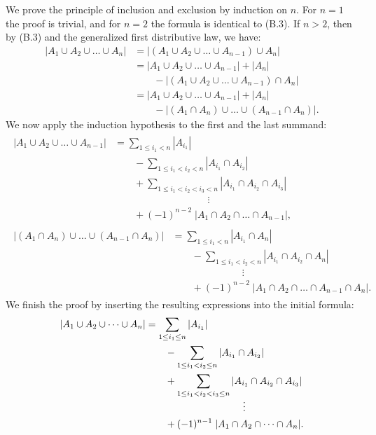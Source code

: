 We prove the principle of inclusion and exclusion by induction on $n$.
For $n=1$ the proof is trivial, and for $n=2$ the formula is identical to (B.3).
If $n>2$, then by (B.3) and the generalized first distributive law, we have:
\begin{align*}
    |A_1\cup A_2\cup\dots\cup A_n| &= |(A_1\cup A_2\cup\dots\cup A_{n-1})\cup A_n| \\
    &= |A_1\cup A_2\cup\dots\cup A_{n-1}|+|A_n| \\
    &\qquad {}-|(A_1\cup A_2\cup\dots\cup A_{n-1})\cap A_n| \\
    &= |A_1\cup A_2\cup\dots\cup A_{n-1}|+|A_n| \\
    &\qquad {}-|(A_1\cap A_n)\cup\dots\cup(A_{n-1}\cap A_n)|.
\end{align*}
We now apply the induction hypothesis to the first and the last summand:
\begin{gather*}
    \begin{align*}
        |A_1\cup A_2\cup\dots\cup A_{n-1}| &= \sum_{1\le i_1<n}|A_{i_1}| \\
        &\qquad {}-\sum_{1\le i_1<i_2<n}|A_{i_1}\cap A_{i_2}| \\
        &\qquad {}+\sum_{1\le i_1<i_2<i_3<n}|A_{i_1}\cap A_{i_2}\cap A_{i_3}| \\[-2mm]
        &\hspace{4cm}\vdots \\
        &\qquad {}+(-1)^{n-2}\;|A_1\cap A_2\cap\dots\cap A_{n-1}|,
    \end{align*}\\[5mm]
    \begin{align*}
        |(A_1\cap A_n)\cup\dots\cup(A_{n-1}\cap A_n)| &= \sum_{1\le i_1<n}|A_{i_1}\cap A_n| \\
        &\qquad {}-\sum_{1\le i_1<i_2<n}|A_{i_1}\cap A_{i_2}\cap A_n| \\[-2mm]
        &\hspace{3cm}\vdots \\
        &\qquad {}+(-1)^{n-2}\;|A_1\cap A_2\cap\dots\cap A_{n-1}\cap A_n|.
    \end{align*}
\end{gather*}
We finish the proof by inserting the resulting expressions into the initial formula:
\begin{align*}
    |A_1\cup A_2\cup\dots\cup A_n| &= \sum_{1\le i_1\le n}|A_{i_1}| \\
    &\qquad {}-\sum_{1\le i_1<i_2\le n}|A_{i_1}\cap A_{i_2}| \\
    &\qquad {}+\sum_{1\le i_1<i_2<i_3\le n}|A_{i_1}\cap A_{i_2}\cap A_{i_3}| \\[-2mm]
    &\hspace{3.5cm}\vdots \\
    &\qquad {}+(-1)^{n-1}\;|A_1\cap A_2\cap\dots\cap A_n|.
\end{align*}
